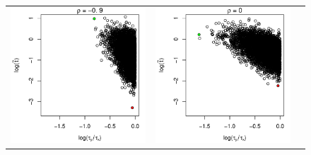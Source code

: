 \documentclass[10pt]{article}
\begin{document}
\begin{enumerate}
\begin{figure}
  \centering
  \begin{tabular}{ccc}
    \begin{minipage}{0.3\textwidth}
      \centering
      \includegraphics[width=1\linewidth]{small-sigma-t-scatterplot--09.pdf}
    \end{minipage}
    & \begin{minipage}{0.3\textwidth}
      \centering
      \includegraphics[width=1\linewidth]{small-sigma-t-scatterplot-0.pdf}

\end{minipage}
\end{tabular}
\end{figure}
\end{enumerate}
\end{document}
